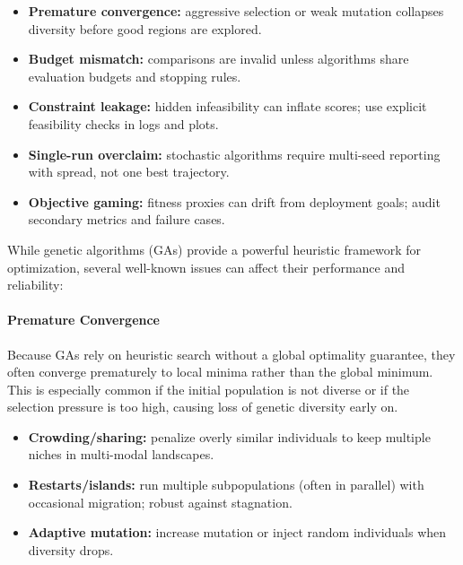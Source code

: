\begin{tcolorbox}[summarybox, title={Risk \& audit}]
\begin{itemize}
    \item \textbf{Premature convergence:} aggressive selection or weak mutation collapses diversity before good regions are explored.
    \item \textbf{Budget mismatch:} comparisons are invalid unless algorithms share evaluation budgets and stopping rules.
    \item \textbf{Constraint leakage:} hidden infeasibility can inflate scores; use explicit feasibility checks in logs and plots.
    \item \textbf{Single-run overclaim:} stochastic algorithms require multi-seed reporting with spread, not one best trajectory.
    \item \textbf{Objective gaming:} fitness proxies can drift from deployment goals; audit secondary metrics and failure cases.
\end{itemize}
\end{tcolorbox}

While genetic algorithms (GAs) provide a powerful heuristic framework for optimization, several well-known issues can affect their performance and reliability:

\paragraph{Premature Convergence}
Because GAs rely on heuristic search without a global optimality guarantee, they often converge prematurely to local minima rather than the global minimum. This is especially common if the initial population is not diverse or if the selection pressure is too high, causing loss of genetic diversity early on.

\begin{tcolorbox}[summarybox, title={Diversity maintenance}]
\begin{itemize}
    \item \textbf{Crowding/sharing:} penalize overly similar individuals to keep multiple niches in multi-modal landscapes.
    \item \textbf{Restarts/islands:} run multiple subpopulations (often in parallel) with occasional migration; robust against stagnation.
    \item \textbf{Adaptive mutation:} increase mutation or inject random individuals when diversity drops.
\end{itemize}
\end{tcolorbox}

